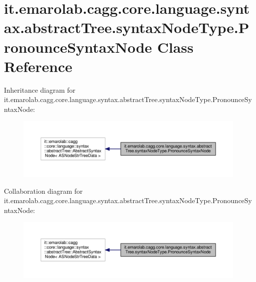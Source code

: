 \hypertarget{classit_1_1emarolab_1_1cagg_1_1core_1_1language_1_1syntax_1_1abstractTree_1_1syntaxNodeType_1_1PronounceSyntaxNode}{\section{it.\-emarolab.\-cagg.\-core.\-language.\-syntax.\-abstract\-Tree.\-syntax\-Node\-Type.\-Pronounce\-Syntax\-Node Class Reference}
\label{classit_1_1emarolab_1_1cagg_1_1core_1_1language_1_1syntax_1_1abstractTree_1_1syntaxNodeType_1_1PronounceSyntaxNode}
}


Inheritance diagram for it.\-emarolab.\-cagg.\-core.\-language.\-syntax.\-abstract\-Tree.\-syntax\-Node\-Type.\-Pronounce\-Syntax\-Node\-:\nopagebreak
\begin{figure}[H]
\begin{center}
\leavevmode
\includegraphics[width=350pt]{classit_1_1emarolab_1_1cagg_1_1core_1_1language_1_1syntax_1_1abstractTree_1_1syntaxNodeType_1_1P012508ca04313cf679786efed4afa345}
\end{center}
\end{figure}


Collaboration diagram for it.\-emarolab.\-cagg.\-core.\-language.\-syntax.\-abstract\-Tree.\-syntax\-Node\-Type.\-Pronounce\-Syntax\-Node\-:\nopagebreak
\begin{figure}[H]
\begin{center}
\leavevmode
\includegraphics[width=350pt]{classit_1_1emarolab_1_1cagg_1_1core_1_1language_1_1syntax_1_1abstractTree_1_1syntaxNodeType_1_1PronounceSyntaxNode__coll__graph}
\end{center}
\end{figure}
